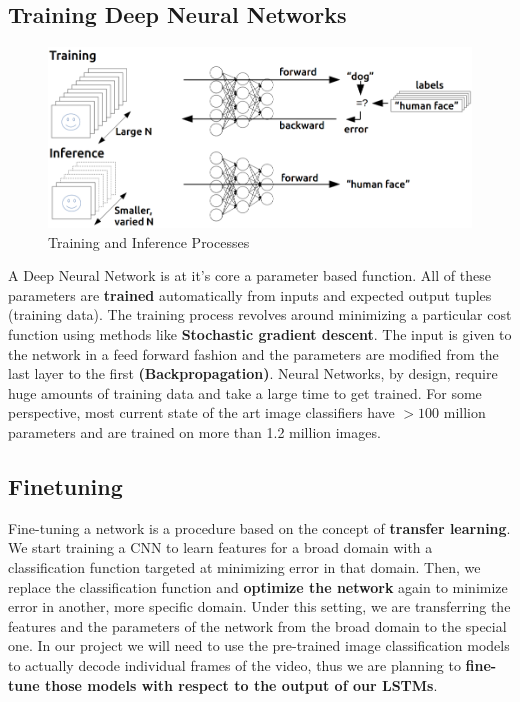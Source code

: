 \documentclass[12pt]{article}
\begin{document}
			\subsection{Training Deep Neural Networks}
					\begin{figure}[ht!]
					\includegraphics[width=14cm]{training_inference1.png}
					\caption{Training and Inference Processes\label{fig5}}
				\end{figure}
				A Deep Neural Network is at it's core a parameter based function. All of these parameters are  \textbf{trained} automatically from inputs and expected output tuples (training data). The training process revolves around minimizing a particular cost function using methods like \textbf{Stochastic gradient descent}. The input is given to the network in a feed forward fashion and the parameters are modified from the last layer to the first \textbf{(Backpropagation)}. Neural Networks, by design, require huge amounts of training data and take a large time to get trained. For some perspective, most current state of the art image classifiers have $> 100$ million parameters and are trained on more than 1.2 million images. 


			\subsection{Finetuning}
				Fine-tuning a network is a procedure based on the concept of
				\textbf{transfer learning}. We start training a CNN to learn features for a broad domain with a
				classification function targeted at minimizing error in that domain. Then, we
				replace the classification function and \textbf{optimize the network} again to minimize
				error in another, more specific domain. Under this setting, we are transferring
				the features and the parameters of the network from the broad domain to the
				special one.\cite{fineplant} In our project we will need to use the pre-trained image classification models 
				to actually decode individual frames of the video, thus we are planning to \textbf{fine-tune those models
				with respect to the output of our LSTMs}.
\end{document}
